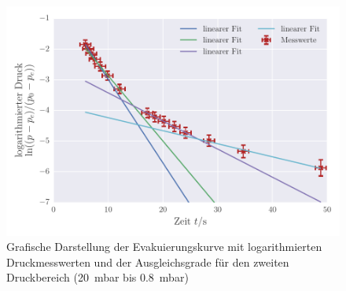 \begin{figure}[!h]
 \centering
 \includegraphics[scale=.80]{../Grafiken/Evakuierungskurve_Drehschieber_log_1.pdf}
 \caption{Grafische Darstellung der Evakuierungskurve mit logarithmierten Druckmesswerten und der Ausgleichsgrade für den zweiten Druckbereich (\SI{20}{\milli\bar} bis \SI{0.8}{\milli\bar}) \label{fig:evakuierungskurve_drehschieber_log_1}}
 \end{figure} 
